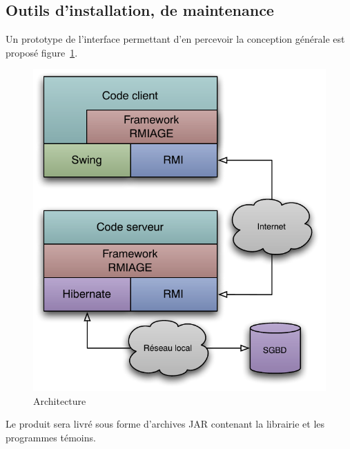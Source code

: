 \subsection{Outils d’installation, de maintenance}
Un prototype de l'interface permettant d'en percevoir la conception générale est proposé figure~\ref{fig:archi}.

\begin{figure}[htbp]
	\centering
		\includegraphics[scale=1]{../diagrammes/architecture.pdf}
	\caption{Architecture}
	\label{fig:archi}
\end{figure}

Le produit sera livré sous forme d'archives JAR contenant la librairie et les programmes témoins.


